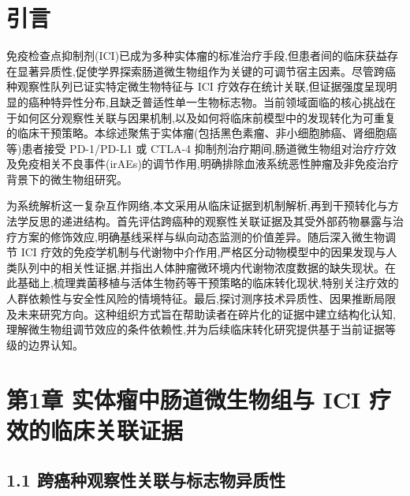 \section{引言}\label{ux5f15ux8a00}

免疫检查点抑制剂(ICI)已成为多种实体瘤的标准治疗手段,但患者间的临床获益存在显著异质性,促使学界探索肠道微生物组作为关键的可调节宿主因素。尽管跨癌种观察性队列已证实特定微生物特征与 ICI 疗效存在统计关联,但证据强度呈现明显的癌种特异性分布,且缺乏普适性单一生物标志物。当前领域面临的核心挑战在于如何区分观察性关联与因果机制,以及如何将临床前模型中的发现转化为可重复的临床干预策略。本综述聚焦于实体瘤(包括黑色素瘤、非小细胞肺癌、肾细胞癌等)患者接受 PD-1/PD-L1 或 CTLA-4 抑制剂治疗期间,肠道微生物组对治疗疗效及免疫相关不良事件(irAEs)的调节作用,明确排除血液系统恶性肿瘤及非免疫治疗背景下的微生物组研究。

为系统解析这一复杂互作网络,本文采用从临床证据到机制解析,再到干预转化与方法学反思的递进结构。首先评估跨癌种的观察性关联证据及其受外部药物暴露与治疗方案的修饰效应,明确基线采样与纵向动态监测的价值差异。随后深入微生物调节 ICI 疗效的免疫学机制与代谢物中介作用,严格区分动物模型中的因果发现与人类队列中的相关性证据,并指出人体肿瘤微环境内代谢物浓度数据的缺失现状。在此基础上,梳理粪菌移植与活体生物药等干预策略的临床转化现状,特别关注疗效的人群依赖性与安全性风险的情境特征。最后,探讨测序技术异质性、因果推断局限及未来研究方向。这种组织方式旨在帮助读者在碎片化的证据中建立结构化认知,理解微生物组调节效应的条件依赖性,并为后续临床转化研究提供基于当前证据等级的边界认知。

\section{第1章 实体瘤中肠道微生物组与 ICI 疗效的临床关联证据}\label{ux7b2c1ux7ae0-ux5b9eux4f53ux7624ux4e2dux80a0ux9053ux5faeux751fux7269ux7ec4ux4e0e-ici-ux7597ux6548ux7684ux4e34ux5e8aux5173ux8054ux8bc1ux636e}

\subsection{1.1 跨癌种观察性关联与标志物异质性}\label{ux8de8ux764cux79cdux89c2ux5bdfux6027ux5173ux8054ux4e0eux6807ux5fd7ux7269ux5f02ux8d28ux6027}

